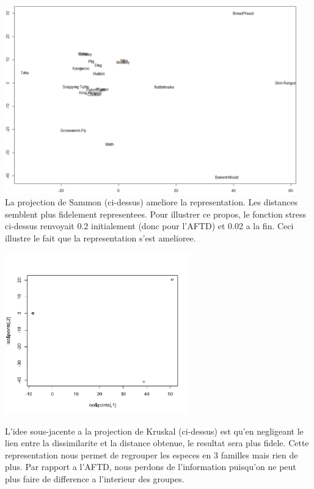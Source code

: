 \documentclass[a4paper,11pt]{article}
\begin{document}
\hspace{-.8cm} \includegraphics[width=0.95\textwidth]{Exo2/sammon1.pdf}\\

\noindent La projection de Sammon (ci-dessus) ameliore la representation. Les distances semblent plus fidelement representees. Pour illustrer ce propos, le fonction stress ci-dessus renvoyait 0.2 initialement (donc pour l'AFTD) et 0.02 a la fin. Ceci illustre le fait que la representation s'est amelioree.

\begin{center}
\includegraphics[width=0.6\textwidth]{Exo2/Kruskal.pdf}\\
\end{center}

\noindent L'idee sous-jacente a la projection de Kruskal (ci-dessus) est qu'en negligeant le lien entre la dissimilarite et la distance obtenue, le resultat sera plus fidele.
Cette representation nous permet de regrouper les especes en 3 familles mais rien de plus. Par rapport a l'AFTD, nous perdons de l'information puisqu'on ne peut plus faire de difference a l'interieur des groupes.\\
\\
\end{document}
